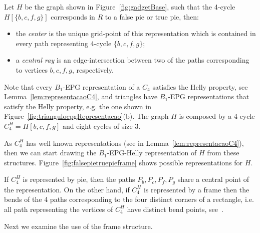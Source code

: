 \documentclass[runningheads]{llncs}
\begin{document}

\begin{definition}
Let $H$ be the graph shown in Figure~\ref{fig:gadgetBase}, such that the 4-cycle $H[\{b, c, f, g \}]$ corresponds in $R$ to a false pie or true pie, then:

\begin{itemize}
\item the \emph{center} is the unique grid-point of this representation which is contained in every path representing 4-cycle $ \{b, c, f, g \}$; \label{lab:lab1}

\item a \emph {central ray} is an edge-intersection  between two of the paths corresponding to vertices  $ b, c, f, g$, respectively.
\end{itemize}
\end{definition}


Note that every $B_1$-EPG representation of a $C_4$ satisfies the Helly property, see Lemma~\ref{lem:representacaoC4}, and triangles have $B_1$-EPG representations that satisfy the Helly property, e.g. the one shown in Figure~\ref{fig:trianguloepgRepresentacao}(b). The graph $H$ is composed by a 4-cycle  $C_4^{H}=H[b, c, f, g]$ and eight cycles of size 3.%

As $C_4^{H}$ has well known representations (see in Lemma~\ref{lem:representacaoC4}), then we can start drawing the $B_{1}$-EPG-Helly representation of $H$ from these structures.  Figure~\ref{fig:falsepietruepieframe} shows possible representations for $H$.



If $C_4^{H}$ is represented by pie, then the paths $P_{b}, P_{c}, P_{f}, P_{g}$ share a central point of the representation. On the other hand, if $C_4^{H}$ is represented by a frame then the bends of the 4 paths corresponding to the four distinct corners of a rectangle, i.e. all path representing the vertices of $C_4^{H}$ have distinct bend points, see~\cite{golumbic2009}.

Next we examine the use of the frame structure.
\end{document}
